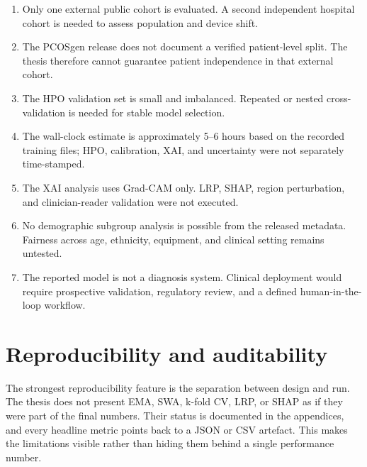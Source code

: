 \documentclass[../preamble.tex]{subfiles}
\begin{document}
\begin{enumerate}
  \item Only one external public cohort is evaluated. A second independent
        hospital cohort is needed to assess population and device shift.
  \item The PCOSgen release does not document a verified patient-level split.
        The thesis therefore cannot guarantee patient independence in that
        external cohort.
  \item The HPO validation set is small and imbalanced. Repeated or nested
        cross-validation is needed for stable model selection.
  \item The wall-clock estimate is approximately 5--6 hours based on the
        recorded training files; HPO, calibration, XAI, and uncertainty were
        not separately time-stamped.
  \item The XAI analysis uses Grad-CAM only. LRP, SHAP, region perturbation,
        and clinician-reader validation were not executed.
  \item No demographic subgroup analysis is possible from the released
        metadata. Fairness across age, ethnicity, equipment, and clinical
        setting remains untested.
  \item The reported model is not a diagnosis system. Clinical deployment
        would require prospective validation, regulatory review, and a
        defined human-in-the-loop workflow.
\end{enumerate}

\section{Reproducibility and auditability}
\label{sec:discussion-repro}

The strongest reproducibility feature is the separation between design and
run. The thesis does not present EMA, SWA, k-fold CV, LRP, or SHAP as if they
were part of the final numbers. Their status is documented in the appendices,
and every headline metric points back to a JSON or CSV artefact. This makes
the limitations visible rather than hiding them behind a single performance
number.
\end{document}
